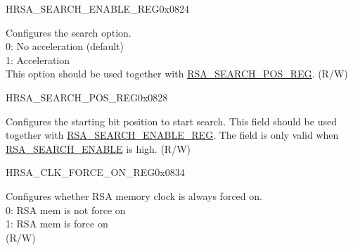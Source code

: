 \begin{register}{H}{RSA\_SEARCH\_ENABLE\_REG}{0x0824}\label{regdesc:RSASEARCHENABLEREG}
%
%
\regnewline%
\begin{regdesc}\begin{reglist}
\label{fielddesc:RSASEARCHENABLE}\item [RSA\_SEARCH\_ENABLE] Configures the search option. \\
0: No acceleration (default)\\
1: Acceleration\\
This option should be used together with \hyperref[regdesc:RSASEARCHPOSREG]{RSA\_SEARCH\_POS\_REG}. (R/W)
\end{reglist}\end{regdesc}
\end{register}


\begin{register}{H}{RSA\_SEARCH\_POS\_REG}{0x0828}\label{regdesc:RSASEARCHPOSREG}
%
%
\regnewline%
\begin{regdesc}\begin{reglist}
\label{fielddesc:RSASEARCHPOS}\item [RSA\_SEARCH\_POS] Configures the starting bit position to start search. This field should be used together with \hyperref[regdesc:RSASEARCHENABLEREG]{RSA\_SEARCH\_ENABLE\_REG}. The field is only valid when \hyperref[fielddesc:RSASEARCHENABLE]{RSA\_SEARCH\_ENABLE} is high. (R/W)
\end{reglist}\end{regdesc}
\end{register}

\begin{register}{H}{RSA\_CLK\_FORCE\_ON\_REG}{0x0834}\label{regdesc:RSACLKFORCEONREG}
%
%
\regnewline%
\begin{regdesc}\begin{reglist}
\label{fielddesc:RSAMEMCLKFORCEON}\item [RSA\_MEM\_CLK\_FORCE\_ON] Configures whether RSA memory clock is always forced on.\\
0: RSA mem is not force on\\
1: RSA mem is force on\\
 (R/W)
\end{reglist}\end{regdesc}
\end{register}

